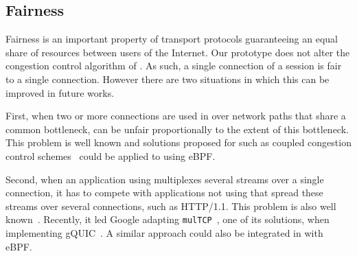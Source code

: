 \subsection{\tcpls Fairness}

Fairness is an important property of transport protocols guaranteeing an equal share of resources between users of the Internet. Our \tcpls prototype does not alter the congestion control algorithm of \tcp. As  such, a single connection of a \tcpls session is fair to a single \tcp connection. However there are two situations in which this can be improved in future works.

First, when two or more \tcp connections are used in \tcpls over network paths that share a common bottleneck, \tcpls can be unfair proportionally to the extent of this bottleneck. This problem is well known and solutions proposed for \mptcp such as coupled congestion control
schemes~\cite{wischik2011design,peng2014multipath,khalili2013mptcp} could be
applied to \tcpls using eBPF.

Second, when an application using \tcpls multiplexes several streams over a
single connection, it has to compete with applications not using \tcpls that
spread these streams over several connections, such as HTTP/1.1. This problem
is also well known~\cite{min2019experimental}. Recently, it led Google adapting
\texttt{mulTCP}~\cite{crowcroft1998differentiated}, one of its solutions, when
implementing gQUIC~\cite{langley2017quic}. A similar approach could also be
integrated in \tcpls with eBPF.


